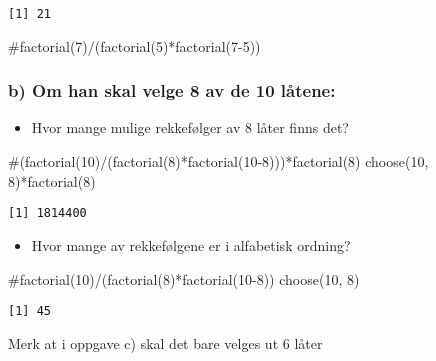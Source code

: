 \documentclass[
  12pt,
  a4paper,
  DIV=11,
  numbers=noendperiod]{scrartcl}
\newenvironment{Shaded}{\begin{snugshade}}{\end{snugshade}}
\newcommand{\CommentTok}[1]{\textcolor[rgb]{0.37,0.37,0.37}{#1}}
\newcommand{\DecValTok}[1]{\textcolor[rgb]{0.68,0.00,0.00}{#1}}
\newcommand{\FunctionTok}[1]{\textcolor[rgb]{0.28,0.35,0.67}{#1}}
\newcommand{\NormalTok}[1]{\textcolor[rgb]{0.00,0.23,0.31}{#1}}
\newcommand{\SpecialCharTok}[1]{\textcolor[rgb]{0.37,0.37,0.37}{#1}}
\providecommand{\tightlist}{%
  \setlength{\itemsep}{0pt}\setlength{\parskip}{0pt}}\usepackage{longtable,booktabs,array}
\begin{document}
\begin{verbatim}
[1] 21
\end{verbatim}

\begin{Shaded}
\begin{Highlighting}[]
\CommentTok{\#factorial(7)/(factorial(5)*factorial(7{-}5))}
\end{Highlighting}
\end{Shaded}

\subsubsection{b) Om han skal velge 8 av de 10
låtene:}\label{b-om-han-skal-velge-8-av-de-10-luxe5tene}

\begin{itemize}
\tightlist
\item
  Hvor mange mulige rekkefølger av 8 låter finns det?
\end{itemize}

\begin{Shaded}
\begin{Highlighting}[]
\CommentTok{\#(factorial(10)/(factorial(8)*factorial(10{-}8)))*factorial(8)}
\FunctionTok{choose}\NormalTok{(}\DecValTok{10}\NormalTok{, }\DecValTok{8}\NormalTok{)}\SpecialCharTok{*}\FunctionTok{factorial}\NormalTok{(}\DecValTok{8}\NormalTok{)}
\end{Highlighting}
\end{Shaded}

\begin{verbatim}
[1] 1814400
\end{verbatim}

\begin{itemize}
\tightlist
\item
  Hvor mange av rekkefølgene er i alfabetisk ordning?
\end{itemize}

\begin{Shaded}
\begin{Highlighting}[]
\CommentTok{\#factorial(10)/(factorial(8)*factorial(10{-}8))}
\FunctionTok{choose}\NormalTok{(}\DecValTok{10}\NormalTok{, }\DecValTok{8}\NormalTok{)}
\end{Highlighting}
\end{Shaded}

\begin{verbatim}
[1] 45
\end{verbatim}

Merk at i oppgave c) skal det bare velges ut 6 låter
\end{document}
